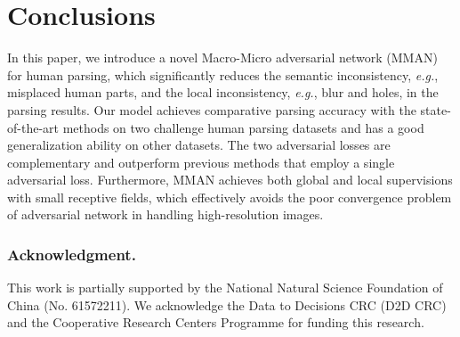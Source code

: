 \documentclass[runningheads]{llncs}
\begin{document}
\section{Conclusions}
In this paper, we introduce a novel Macro-Micro adversarial network (MMAN) for human parsing, which significantly reduces the semantic inconsistency, \emph{e.g.}, misplaced human parts, and the local inconsistency, \emph{e.g.}, blur and holes, in the parsing results. Our model achieves comparative parsing accuracy with the state-of-the-art methods on two challenge human parsing datasets and has a good generalization ability on other datasets. The two adversarial losses are complementary and outperform previous methods that employ a single adversarial loss. Furthermore, MMAN achieves both global and local supervisions with small receptive fields, which effectively avoids the poor convergence problem of adversarial network in handling high-resolution images.
\subsubsection{Acknowledgment.}
This work is partially supported by the National Natural Science Foundation of China (No. 61572211). We acknowledge the Data to Decisions CRC (D2D CRC) and the Cooperative Research Centers Programme for funding this research.





\end{document}
